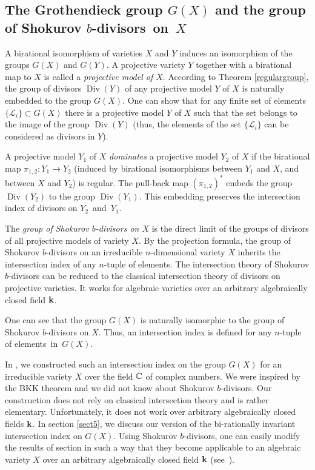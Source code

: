 \documentclass[11pt]{article}
\theoremstyle{plain}
\theoremstyle{definition}
\newcommand\Div{\operatorname{Div}}
\begin{document}
\subsection{The Grothendieck group $G(X)$ and the group of Shokurov  $b$-divisors~on~$X$}\label{subsec3.4}
A birational isomorphism of varieties $X$ and $Y$ induces an isomorphism   of the groups $G(X)$ and $G(Y)$. A projective variety  $Y$ together with a  birational map to  $X$  is called a {\it projective model of $X$}. According to Theorem \ref{regulargroup}, the group of  divisors  $\Div(Y)$ of any projective model $Y$ of $X$ is naturally embedded to the group $G(X)$. One can show that for any finite set of elements $\{\mathcal L_i\}\subset G(X)$  there is a projective model $Y$ of $X$ such that the set  belongs to the image of the group $\Div(Y)$ (thus, the elements of the set $\{\mathcal L_i\}$
  can be considered as  divisors in $Y$).

A projective model $Y_1$ of $X$ {\it  dominates} a projective model $Y_2$ of $X$ if the birational map $\pi_{1,2}:Y_1\to Y_2$ (induced by birational isomorphisms between $Y_1$ and $X$, and between $X$ and $Y_2$)   is regular. The pull-back map $(\pi_{1,2})^*$ embeds the group $\Div (Y_2)$ to the group $\Div (Y_1)$. This embedding preserves the intersection index of divisors on $Y_2$~and~$Y_1$.


The {\it  group of Shokurov $b$-divisors on $X$} is
the direct limit of the  groups of  divisors of all  projective models of variety $X$.
By the projection formula, the group of  Shokurov $b$-divisors on an irreducible $n$-dimensional variety $X$ inherits the intersection index of any $n$-tuple of elements. The intersection theory of Shokurov $b$-divisors can be reduced to the classical intersection theory of  divisors on projective varieties. It works for algebraic varieties over an arbitrary algebraically closed field $\bold k$.

One can see  that the group $G(X)$ is naturally isomorphic to the group of Shokurov $b$-divisors on $X$. Thus, an intersection  index is defined for any $n$-tuple of elements~in~$G(X)$.

In  \cite{K-K10}, we constructed such an intersection index on the group $G(X)$ for an irreducible variety $X$ over the field $\Bbb C$ of complex numbers. We were inspired by the BKK theorem and we did not know  about Shokurov $b$-divisors. Our construction does not rely on classical intersection theory and is rather elementary. Unfortunately, it does not work over arbitrary algebraically closed fields $\bold k$. In section \ref{sect5}, we discuss our version of the bi-rationally invariant intersection  index on $G(X)$. Using Shokurov $b$-divisors, one can easily modify the results of section in such a way that they become applicable to an algebraic variety $X$ over an arbitrary algebraically closed field $\bold k$ (see~\cite{K-K14}).
\end{document}
